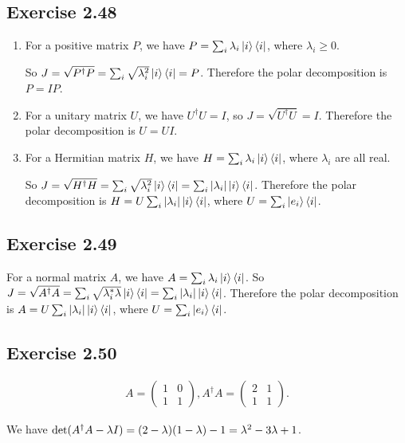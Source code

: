 \subsection*{Exercise 2.48}
\begin{enumerate}[(1)]
    \item For a positive matrix $P$, we have $P=\sum_i\lambda_i\ket{i}\bra{i}$, where $\lambda_i\geq 0$.
    
    So $J=\sqrt{P^\dagger P}=\sum_i\sqrt{\lambda_i^2}\ket{i}\bra{i}=P$. Therefore the polar decomposition is $P=IP$.
    
    \item For a unitary matrix $U$, we have $U^\dagger U = I$, so $J=\sqrt{U^\dagger U}=I$. Therefore the polar decomposition is $U=UI$.
    
    \item For a Hermitian matrix $H$, we have $H=\sum_i\lambda_i\ket{i}\bra{i}$, where $\lambda_i$ are all real.
    
     So $J=\sqrt{H^\dagger H}=\sum_i\sqrt{\lambda_i^2}\ket{i}\bra{i}=\sum_i|\lambda_i|\ket{i}\bra{i}$. Therefore the polar decomposition is $H=U\sum_i|\lambda_i|\ket{i}\bra{i}$, where $U=\sum_i\ket{e_i}\bra{i}$.
\end{enumerate}

\subsection*{Exercise 2.49}

For a normal matrix $A$, we have $A=\sum_i\lambda_i\ket{i}\bra{i}$. So $J=\sqrt{A^\dagger A}=\sum_i\sqrt{\lambda_i^*\lambda}\ket{i}\bra{i}=\sum_i|\lambda_i|\ket{i}\bra{i}$. Therefore the polar decomposition is $A=U\sum_i|\lambda_i|\ket{i}\bra{i}$, where $U=\sum_i\ket{e_i}\bra{i}$.

\subsection*{Exercise 2.50}

\begin{align}
A=\begin{pmatrix}1&0\\1&1\end{pmatrix},A^\dagger A=\begin{pmatrix}2&1\\1&1\end{pmatrix}.
\end{align}

We have ${\rm det}(A^\dagger A-\lambda I)=(2-\lambda)(1-\lambda)-1=\lambda^2-3\lambda+1$.

